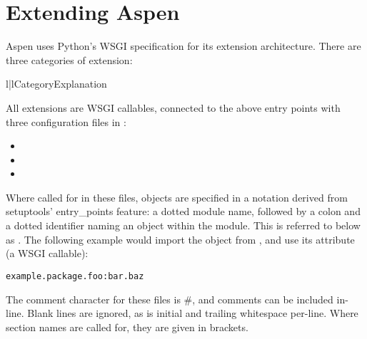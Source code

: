 \chapter{Extending Aspen \label{extending}}

Aspen uses Python's WSGI specification for its extension architecture. There are
three categories of extension:

\begin{tableii}{l|l}{}{Category}{Explanation}
\end{tableii}

All extensions are WSGI callables, connected to the above entry points with
three configuration files in :

\begin{itemize}
\item{}
\item{}
\item{}
\end{itemize}

Where called for in these files, objects are specified in a notation derived
from setuptools' entry_points feature: a dotted module name, followed by a colon
and a dotted identifier naming an object within the module. This is referred to
below as . The following example would import the 
object from , and use its  attribute (a WSGI
callable):

\begin{verbatim}
example.package.foo:bar.baz
\end{verbatim}


The comment character for these files is \#, and comments can be included
in-line. Blank lines are ignored, as is initial and trailing whitespace
per-line. Where section names are called for, they are given in brackets.


